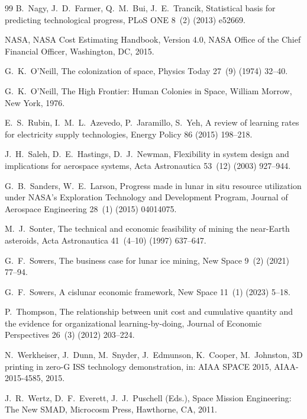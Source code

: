 \documentclass[preprint,12pt]{elsarticle}
\begin{document}
\begin{thebibliography}{99}
B.~Nagy, J.~D.~Farmer, Q.~M.~Bui, J.~E.~Trancik,
\newblock Statistical basis for predicting technological progress,
\newblock PLoS ONE 8~(2) (2013) e52669.

NASA,
\newblock NASA Cost Estimating Handbook, Version 4.0,
\newblock NASA Office of the Chief Financial Officer, Washington, DC, 2015.

G.~K.~O'Neill,
\newblock The colonization of space,
\newblock Physics Today 27~(9) (1974) 32--40.

G.~K.~O'Neill,
\newblock The High Frontier: Human Colonies in Space,
\newblock William Morrow, New York, 1976.

E.~S.~Rubin, I.~M.~L.~Azevedo, P.~Jaramillo, S.~Yeh,
\newblock A review of learning rates for electricity supply technologies,
\newblock Energy Policy 86 (2015) 198--218.

J.~H.~Saleh, D.~E.~Hastings, D.~J.~Newman,
\newblock Flexibility in system design and implications for aerospace systems,
\newblock Acta Astronautica 53~(12) (2003) 927--944.

G.~B.~Sanders, W.~E.~Larson,
\newblock Progress made in lunar in situ resource utilization under NASA's Exploration Technology and Development Program,
\newblock Journal of Aerospace Engineering 28~(1) (2015) 04014075.

M.~J.~Sonter,
\newblock The technical and economic feasibility of mining the near-Earth asteroids,
\newblock Acta Astronautica 41~(4--10) (1997) 637--647.

G.~F.~Sowers,
\newblock The business case for lunar ice mining,
\newblock New Space 9~(2) (2021) 77--94.

G.~F.~Sowers,
\newblock A cislunar economic framework,
\newblock New Space 11~(1) (2023) 5--18.

P.~Thompson,
\newblock The relationship between unit cost and cumulative quantity and the evidence for organizational learning-by-doing,
\newblock Journal of Economic Perspectives 26~(3) (2012) 203--224.

N.~Werkheiser, J.~Dunn, M.~Snyder, J.~Edmunson, K.~Cooper, M.~Johnston,
\newblock 3D printing in zero-G ISS technology demonstration,
\newblock in: AIAA SPACE 2015, AIAA-2015-4585, 2015.

J.~R.~Wertz, D.~F.~Everett, J.~J.~Puschell (Eds.),
\newblock Space Mission Engineering: The New SMAD,
\newblock Microcosm Press, Hawthorne, CA, 2011.


\end{thebibliography}
\end{document}
